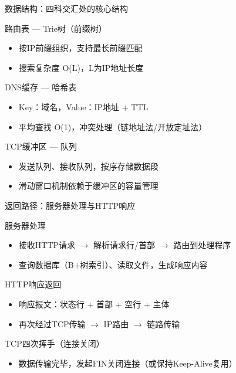 \documentclass[10pt, aspectratio=169]{beamer}
\begin{document}
\begin{frame}{数据结构：四科交汇处的核心结构}
    \begin{block}{路由表 --- Trie树（前缀树）}
        \begin{itemize}
            \item 按IP前缀组织，支持最长前缀匹配
            \item 搜索复杂度 O(L)，L为IP地址长度
        \end{itemize}
    \end{block}
    \begin{block}{DNS缓存 --- 哈希表}
        \begin{itemize}
            \item Key：域名，Value：IP地址 + TTL
            \item 平均查找 O(1)，冲突处理（链地址法/开放定址法）
        \end{itemize}
    \end{block}
    \begin{block}{TCP缓冲区 --- 队列}
        \begin{itemize}
            \item 发送队列、接收队列，按序存储数据段
            \item 滑动窗口机制依赖于缓冲区的容量管理
        \end{itemize}
    \end{block}
\end{frame}

\begin{frame}{返回路径：服务器处理与HTTP响应}
    \begin{block}{服务器处理}
        \begin{itemize}
            \item 接收HTTP请求 $\to$ 解析请求行/首部 $\to$ 路由到处理程序
            \item 查询数据库（B+树索引）、读取文件，生成响应内容
        \end{itemize}
    \end{block}
    \begin{block}{HTTP响应返回}
        \begin{itemize}
            \item 响应报文：状态行 + 首部 + 空行 + 主体
            \item 再次经过TCP传输 $\to$ IP路由 $\to$ 链路传输
        \end{itemize}
    \end{block}
    \begin{block}{TCP四次挥手（连接关闭）}
        \begin{itemize}
            \item 数据传输完毕，发起FIN关闭连接（或保持Keep-Alive复用）
        \end{itemize}
    \end{block}
\end{frame}
\end{document}
